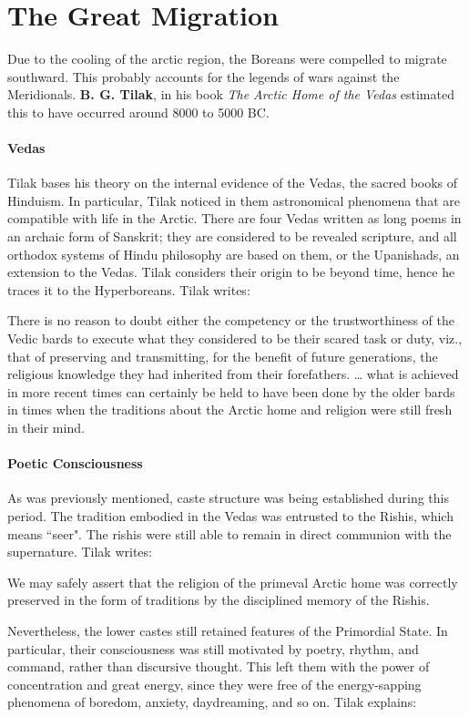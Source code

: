 \section{The Great Migration}

Due to the cooling of the arctic region, the Boreans were compelled to migrate southward. This probably accounts for the legends of wars against the Meridionals. \textbf{B. G. Tilak}, in his book \emph{The Arctic Home of the Vedas} estimated this to have occurred around 8000 to 5000 BC.

\paragraph{Vedas}
Tilak bases his theory on the internal evidence of the Vedas, the sacred books of Hinduism. In particular, Tilak noticed in them astronomical phenomena that are compatible with life in the Arctic. There are four Vedas written as long poems in an archaic form of Sanskrit; they are considered to be revealed scripture, and all orthodox systems of Hindu philosophy are based on them, or the Upanishads, an extension to the Vedas. Tilak considers their origin to be beyond time, hence he traces it to the Hyperboreans. Tilak writes:

\begin{quotex}
There is no reason to doubt either the competency or the trustworthiness of the Vedic bards to execute what they considered to be their scared task or duty, viz., that of preserving and transmitting, for the benefit of future generations, the religious knowledge they had inherited from their forefathers. … what is achieved in more recent times can certainly be held to have been done by the older bards in times when the traditions about the Arctic home and religion were still fresh in their mind.

\end{quotex}
\paragraph{Poetic Consciousness}
As was previously mentioned, caste structure was being established during this period. The tradition embodied in the Vedas was entrusted to the Rishis, which means ``seer". The rishis were still able to remain in direct communion with the supernature. Tilak writes:

\begin{quotex}
We may safely assert that the religion of the primeval Arctic home was correctly preserved in the form of traditions by the disciplined memory of the Rishis.

\end{quotex}
Nevertheless, the lower castes still retained features of the Primordial State. In particular, their consciousness was still motivated by poetry, rhythm, and command, rather than discursive thought. This left them with the power of concentration and great energy, since they were free of the energy-sapping phenomena of boredom, anxiety, daydreaming, and so on. Tilak explains:

